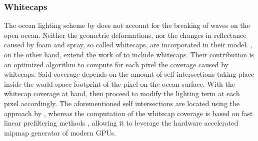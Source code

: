 %
%
\subsubsection{Whitecaps}
The ocean lighting scheme by \citet{article:oceanlighting} does not account for
the breaking of waves on the open ocean. Neither the geometric deformations,
nor the changes in reflectance caused by foam and spray, so called
whitecaps, are incorporated in their model. \citet{article:whitecaps},
on the other hand, extend the work of \citet{misc:oceanlightingfft}
to include whitecaps.
Their contribution is an optimized algorithm to compute for each pixel the
coverage caused by whitecaps. Said coverage depends on the amount of self
intersections taking place inside the world space footprint of the pixel on
the ocean surface. With the whitecap coverage at hand,
\citeauthor{article:whitecaps} then proceed to modify the lighting term at each
pixel accordingly.
The aforementioned self intersections are located using the approach by
\citet{course:simulatingocean}, whereas the computation of the whitecap
coverage is based on fast linear prefiltering methods \citep{Bruneton:2012},
allowing it to leverage the hardware accelerated mipmap generator of modern GPUs.

